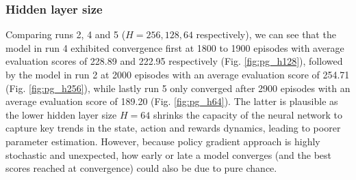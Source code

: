 \documentclass[a4paper, 11pt]{article}
\begin{document}
	\subsubsection{Hidden layer size}
	Comparing runs 2, 4 and 5 ($H=256,128,64$ respectively), we can see that the model in run 4 exhibited convergence first at 1800 to 1900 episodes with average evaluation scores of 228.89 and 222.95 respectively (Fig. \ref{fig:pg_h128}), followed by the model in run 2 at 2000 episodes with an average evaluation score of 254.71 (Fig. \ref{fig:pg_h256}), while lastly run 5 only converged after 2900 episodes with an average evaluation score of 189.20 (Fig. \ref{fig:pg_h64}). 
	The latter is plausible as the lower hidden layer size $H=64$ shrinks the capacity of the neural network to capture key trends in the state, action and rewards dynamics, leading to poorer parameter estimation. However, because policy gradient approach is highly stochastic and unexpected, how early or late a model converges (and the best scores reached at convergence) could also be due to pure chance.
\end{document}
